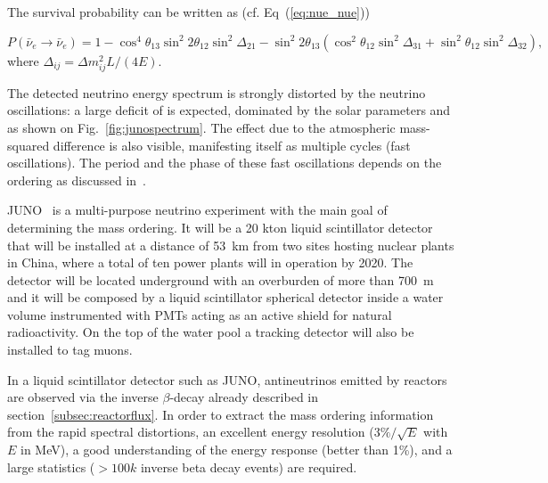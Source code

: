 The \nueb survival probability can be written as (cf. Eq~(\ref{eq:nue_nue}))

\begin{equation}
P(\bar{\nu}_e \rightarrow \bar{\nu}_e) = 1 - \cos^4 \theta_{13} \sin^2 2 \theta_{12}  \sin ^2 \Delta_{21}
- \sin^2 2 \theta_{13} (\cos^2  \theta_{12} \sin^2 \Delta_{31} + \sin^2  \theta_{12}  \sin^2 \Delta_{32} ),
\end{equation} 
where $\Delta_{ij}= \Delta m^2_{ij} L/(4E)$.

The detected neutrino energy spectrum is strongly distorted by the neutrino oscillations: a large deficit of \nueb is expected, dominated by the solar parameters \thsol and \dmsqso as shown on Fig.~\ref{fig:junospectrum}. The effect due to the atmospheric mass-squared difference is also visible, manifesting itself as multiple cycles (fast oscillations). 
The period and the phase of these fast oscillations depends on the ordering as discussed in~\cite{petcov}. 


JUNO~\cite{An:2015jdp} is a multi-purpose neutrino experiment with the main goal of determining the mass ordering. It will be a 20 kton liquid scintillator detector that will be installed at a distance of 53~km from two sites hosting nuclear plants in China, where a total of ten power plants will in operation by 2020. The detector will be located underground with an overburden of more than 700~m and it will be composed by a liquid scintillator spherical detector inside a water volume instrumented with PMTs acting as an active shield for natural radioactivity. On the top of the water pool a tracking detector will also be installed to tag muons. 

In a liquid scintillator detector such as JUNO, antineutrinos emitted by reactors are observed via the inverse $\beta$-decay already described in section~\ref{subsec:reactorflux}. 
In order to extract the mass ordering information from the rapid spectral distortions, an excellent energy resolution ($3\%/ \sqrt{E}$ with $E$ in MeV), a good understanding of the energy response (better than 1\%), and a large statistics ($>100k$ inverse beta decay events) are required.
 
